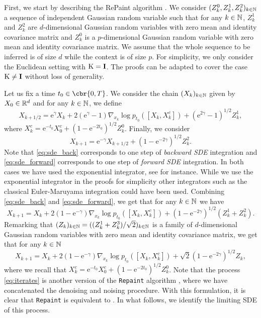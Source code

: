 First, we start by describing the RePaint algorithm \parencite{lugmayr2022repaint}.
We consider $(Z_k^0, Z_k^1, Z_k^2)_{k \in \mathbb{N}}$ a sequence of independent Gaussian random variable such that for any $k \in \mathbb{N}$, $Z_k^1$ and $Z_k^2$ are $d$-dimensional Gaussian random variables with zero mean and identity covariance matrix and $Z_k^0$ is a $p$-dimensional Gaussian random variable with zero mean and identity covariance matrix.
We assume that the whole sequence to be inferred is of size $d$ while the context is of size $p$.
For simplicity, we only consider the Euclidean setting with $\mathrm{K}=\m{I}$.
The proofs can be adapted to cover the case $\mathrm{K} \neq \m{I}$ without loss of generality.

Let us fix a time $t_0 \in \cbr{0,T}$.
We consider the chain $(X_k)_{k \in \mathbb{N}}$ given by $X_0 \in \mathbb{R}^d$ and for any $k \in \mathbb{N}$, we define \begin{equation} \label{eq:sde_back} X_{k+1/2} = \mathrm{e}^{\gamma} X_k + 2 (\mathrm{e}^\gamma - 1) \nabla_{x_k} \log p_{t_0}([X_k, X_k^c]) + (\mathrm{e}^{2\gamma}-1)^{1/2} Z^1_k , \end{equation} where $X_k^c = \mathrm{e}^{-t_0} X_0^c + (1-\mathrm{e}^{-2t_0})^{1/2} Z_k^0$.
Finally, we consider \begin{equation} \label{eq:sde_forward} X_{k+1} = \mathrm{e}^{-\gamma} X_{k+1/2} + (1 - \mathrm{e}^{-2\gamma})^{1/2} Z_k^2.
\end{equation}
Note that \eqref{eq:sde_back} corresponds to one step of \emph{backward SDE} integration and \eqref{eq:sde_forward} corresponds to one step of \emph{forward SDE} integration.
In both cases we have used the exponential integrator, see \cite{de2022convergence} for instance.
While we use the exponential integrator in the proofs for simplicity other integrators such as the classical Euler-Maruyama integration could have been used.
Combining \eqref{eq:sde_back} and \eqref{eq:sde_forward}, we get that for any $k \in \mathbb{N}$ we have \begin{equation} X_{k+1} = X_k + 2 (1 -\mathrm{e}^{-\gamma}) \nabla_{x_k} \log p_{t_0}([X_k, X_k^c]) + (1 - \mathrm{e}^{-2\gamma})^{1/2} (Z_k^1 + Z_k^2) .
\end{equation}
Remarking that $(Z_k)_{k \in \mathbb{N}} = ((Z_k^1 + Z_k^3)/\sqrt{2})_{k \in \mathbb{N}}$ is a family of $d$-dimensional Gaussian random variables with zero mean and identity covariance matrix, we get that for any $k \in \mathbb{N}$ \begin{equation} \label{eq:iterates} X_{k+1} = X_k + 2 (1 -\mathrm{e}^{-\gamma}) \nabla_{x_k} \log p_{t_0}([X_k, X_k^c]) + \sqrt{2} (1 - \mathrm{e}^{-2\gamma})^{1/2} Z_k , \end{equation} where we recall that $X_k^c = \mathrm{e}^{-t_0} X_0^c + (1-\mathrm{e}^{-2t_0})^{1/2} Z_k^0$.
Note that the process \eqref{eq:iterates} is another version of the \texttt{Repaint} algorithm \cite{lugmayr2022repaint}, where we have concatenated the denoising and noising procedure.
With this formulation, it is clear that \texttt{Repaint} is equivalent to .
In what follows, we identify the limiting SDE of this process.

